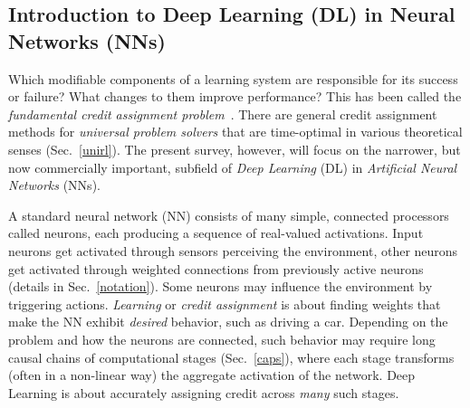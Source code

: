 \documentclass[letterpaper]{article}
\begin{document}
\begin{CJK*}{UTF8}{gbsn}

\section{Introduction to Deep Learning (DL) in Neural Networks (NNs)}
\label{intro}

Which modifiable components of a learning system are responsible for its success or failure?
What changes to them improve performance? 
This has been called the {\em fundamental credit assignment problem}~\citep{Minsky:63}.
There are general credit assignment methods for {\em universal problem solvers} 
that are 
time-optimal in various theoretical senses
(Sec.~\ref{unirl}).
The present survey, however, will focus on the narrower, but now commercially important, subfield
of {\em Deep Learning} (DL) in {\em Artificial Neural Networks} (NNs).


A standard neural network (NN) consists of many simple, connected
processors called neurons, each producing a sequence of real-valued
activations.  Input neurons get activated through sensors perceiving the
environment, other neurons get activated through weighted 
connections from previously active neurons (details in Sec.~\ref{notation}).  
Some neurons may influence the environment
by triggering actions.  {\em Learning} or {\em credit assignment} is
about finding weights that make the NN exhibit {\em desired} behavior,
such as driving a car.  Depending on the problem and how the neurons
are connected, such behavior may require long causal chains of
computational stages (Sec.~\ref{caps}), where each stage transforms
(often in a non-linear way) the aggregate activation of the
network. Deep Learning is about accurately assigning credit across
{\em many} such stages.




\end{CJK*}
\end{document}

